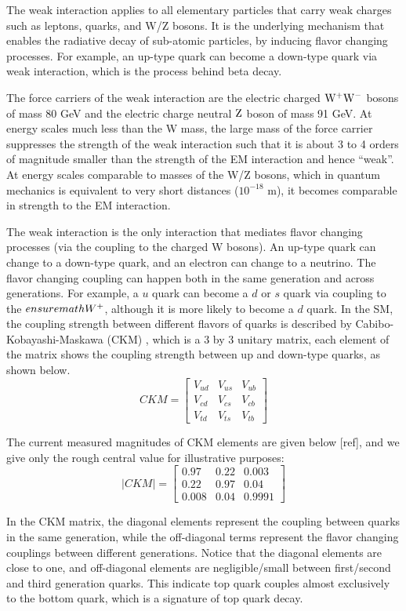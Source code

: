 The weak interaction applies to all elementary particles that carry weak charges such as leptons, quarks, and W/Z bosons. It is the underlying mechanism that enables the radiative decay of sub-atomic particles, by inducing flavor changing processes. For example, an up-type quark can become a down-type quark via weak interaction, which is the process behind beta decay. 

The force carriers of the weak interaction are the electric charged $\mathrm{W}^+\mathrm{W}^-$ bosons of mass 80 GeV and the electric charge neutral $\mathrm{Z}$ boson of mass 91 GeV.  At energy scales much less than the W mass, the large mass of the force carrier suppresses the strength of the weak interaction such that it is about 3 to 4 orders of magnitude smaller than the strength of the EM interaction and hence ``weak''.  At energy scales comparable to masses of the W/Z bosons, which in quantum mechanics is equivalent to very short distances ($10^{-18}$ m), it becomes comparable in strength to the EM interaction.

The weak interaction is the only interaction that mediates flavor changing processes (via the coupling to the charged W bosons). An up-type quark can change to a down-type quark, and an electron can change to a neutrino. The flavor changing coupling can happen both in the same generation and across generations. For example, a $u$ quark can become a $d$ or $s$ quark via coupling to the $ensuremath{W^{+}}$, although it is more likely to become a $d$ quark. In the SM, the coupling strength between different flavors of quarks is described by Cabibo-Kobayashi-Maskawa (CKM) , which is a 3 by 3 unitary matrix, each element of the matrix shows the coupling strength between up and down-type quarks, as shown below.
\[
CKM = 
\begin{bmatrix}
	V_{ud} & V_{us} & V_{ub}\\
	V_{cd} & V_{cs} & V_{cb} \\
	V_{td} & V_{ts} & V_{tb} 
\end{bmatrix}
\]

The current measured magnitudes of CKM elements are given below [ref], and we give only the rough central value for illustrative purposes:
\[
|CKM| = 
\begin{bmatrix}
	0.97 & 0.22 & 0.003  \\
	0.22 & 0.97 & 0.04 \\
	0.008 & 0.04 & 0.9991 
\end{bmatrix}
\]

In the CKM matrix, the diagonal elements represent the coupling between quarks in the same generation, while the off-diagonal terms represent the flavor changing couplings between different generations. Notice that the diagonal elements are close to one, and off-diagonal elements are negligible/small between first/second and third generation quarks. This indicate top quark couples almost exclusively to the bottom quark, which is a signature of top quark decay.

